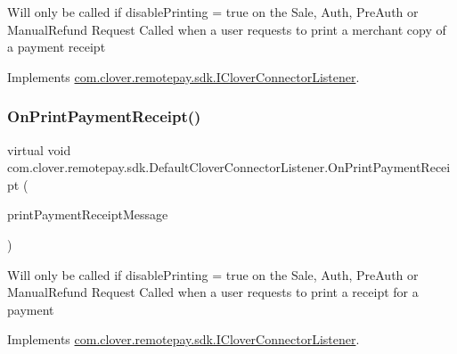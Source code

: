 Will only be called if disable\+Printing = true on the Sale, Auth, Pre\+Auth or Manual\+Refund Request Called when a user requests to print a merchant copy of a payment receipt 



Implements \hyperlink{interfacecom_1_1clover_1_1remotepay_1_1sdk_1_1_i_clover_connector_listener_a487aca873c4e0bfa4222f9712f919efa}{com.\+clover.\+remotepay.\+sdk.\+I\+Clover\+Connector\+Listener}.

\mbox{\label{classcom_1_1clover_1_1remotepay_1_1sdk_1_1_default_clover_connector_listener_aeb819ef1568aac6bfdb54de3e8823685}} 
\subsubsection{\texorpdfstring{On\+Print\+Payment\+Receipt()}{OnPrintPaymentReceipt()}}
{\footnotesize\ttfamily virtual void com.\+clover.\+remotepay.\+sdk.\+Default\+Clover\+Connector\+Listener.\+On\+Print\+Payment\+Receipt (\begin{DoxyParamCaption}\item[{\hyperlink{classcom_1_1clover_1_1remotepay_1_1sdk_1_1_print_payment_receipt_message}{Print\+Payment\+Receipt\+Message}}]{print\+Payment\+Receipt\+Message }\end{DoxyParamCaption})\hspace{0.3cm}{\ttfamily [virtual]}}



Will only be called if disable\+Printing = true on the Sale, Auth, Pre\+Auth or Manual\+Refund Request Called when a user requests to print a receipt for a payment 



Implements \hyperlink{interfacecom_1_1clover_1_1remotepay_1_1sdk_1_1_i_clover_connector_listener_ab37a0d5e7114499b3f1c55e38f6c46c9}{com.\+clover.\+remotepay.\+sdk.\+I\+Clover\+Connector\+Listener}.

\mbox{\label{classcom_1_1clover_1_1remotepay_1_1sdk_1_1_default_clover_connector_listener_a13de716522e58beb9af010207e7362f2}} 
